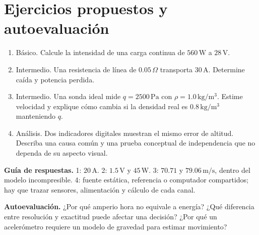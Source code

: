 \section{Ejercicios propuestos y autoevaluación}
\begin{enumerate}
\item Básico. Calcule la intensidad de una carga continua de $560\,\mathrm{W}$ a $28\,\mathrm{V}$.
\item Intermedio. Una resistencia de línea de $0.05\,\Omega$ transporta $30\,\mathrm{A}$. Determine caída y potencia perdida.
\item Intermedio. Una sonda ideal mide $q=2500\,\mathrm{Pa}$ con $\rho=1.0\,\mathrm{kg/m^3}$. Estime velocidad y explique cómo cambia si la densidad real es $0.8\,\mathrm{kg/m^3}$ manteniendo $q$.
\item Análisis. Dos indicadores digitales muestran el mismo error de altitud. Describa una causa común y una prueba conceptual de independencia que no dependa de su aspecto visual.
\end{enumerate}
\textbf{Guía de respuestas.} 1: $20\,\mathrm{A}$. 2: $1.5\,\mathrm{V}$ y $45\,\mathrm{W}$. 3: $70.71$ y $79.06\,\mathrm{m/s}$, dentro del modelo incompresible. 4: fuente estática, referencia o computador compartidos; hay que trazar sensores, alimentación y cálculo de cada canal.

\textbf{Autoevaluación.} ¿Por qué amperio hora no equivale a energía? ¿Qué diferencia entre resolución y exactitud puede afectar una decisión? ¿Por qué un acelerómetro requiere un modelo de gravedad para estimar movimiento?


\studiumchaptercheck
